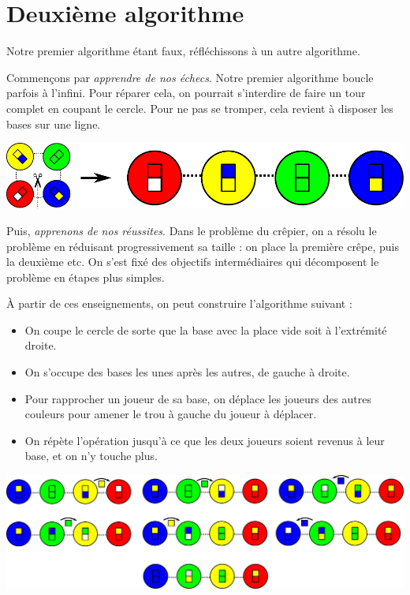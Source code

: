 \documentclass[a5paper,pagesize,DIV=14]{scrbook}
\begin{document}
\newpage

\section*{Deuxième algorithme}

Notre premier algorithme étant faux, réfléchissons à un autre algorithme. 

Commençons par \textit{apprendre de nos échecs}. Notre premier algorithme boucle parfois à l'infini. Pour réparer cela, on pourrait s'interdire de faire un tour complet en coupant le cercle. Pour ne pas se tromper, cela revient à disposer les bases sur une ligne.

\begin{center}
  \includegraphics[width=\linewidth]{img/baseball_ligne.pdf}
\end{center}

Puis, \textit{apprenons de nos réussites}. Dans le problème du crêpier, on a résolu le problème en réduisant progressivement sa taille : on place la première crêpe, puis la deuxième etc. On s'est fixé des objectifs intermédiaires qui décomposent le problème en étapes plus simples.

À partir de ces enseignements, on peut construire l'algorithme suivant :

\begin{itemize}
  \item On coupe le cercle de sorte que la base avec la place vide soit à l'extrémité droite.
  \item On s'occupe des bases les unes après les autres, de gauche à droite.
  \item Pour rapprocher un joueur de sa base, on déplace les joueurs des autres couleurs pour amener le trou à gauche du joueur à déplacer.
  \item On répète l'opération jusqu'à ce que les deux joueurs soient revenus à leur base, et on n'y touche plus.
\end{itemize}

\begin{center}
  \includegraphics[width=\linewidth]{img/baseball_ex3.pdf}
\end{center}
\end{document}
